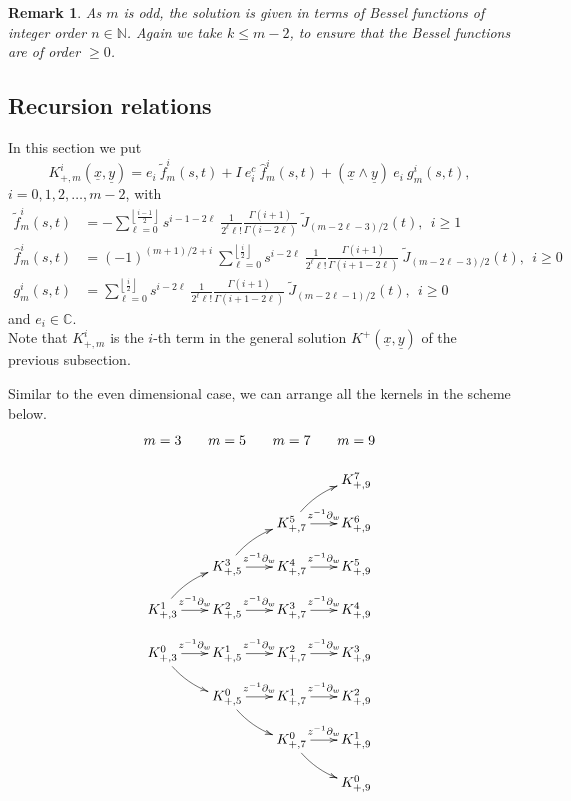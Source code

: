 \documentclass{amsart}
\newtheorem{remark}[theorem]{Remark}
\theoremstyle{remark}
\begin{document}
\begin{remark}
As $m$ is odd, the solution is given in terms of Bessel functions of integer order $n \in \mathbb{N}$. Again we take $k \leq m-2$, to ensure that the Bessel functions are of order $\geq 0$.
\end{remark}
\subsection{Recursion relations}
In this section we put
\begin{equation}\label{kernel odd m}
K^{i}_{+ , m}({\underline{x}},{\underline{y}})  =  e_i \ \tilde{f}_m^i(s,t) + I \ e_i^c \ \hat{f}_m^i(s,t) + ({\underline{x}} \wedge {\underline{y}}) \ e_i \ g_m^i(s,t),
\end{equation}
$i=0,1,2, \ldots , m-2$, with
\begin{align*}
\tilde{f}_m^i(s,t) &= -  \sum_{\ell =0}^{\left\lfloor  \frac{i-1}{2} \right\rfloor} s^{i-1-2 \ell} \ \frac{1}{2^{\ell} \ell!} \frac{\Gamma(i+1)}{\Gamma(i-2\ell)} \ \widetilde{J}_{(m-2\ell-3)/2}(t) , \ \ i \geq 1\\
\hat{f}_m^i (s,t) &=  (-1)^{(m+1)/2+i} \   \sum_{\ell =0}^{\left\lfloor  \frac{i}{2} \right\rfloor} s^{i-2 \ell} \ \frac{1}{2^{\ell} \ell!} \frac{\Gamma(i+1)}{\Gamma(i+1-2\ell)} \ \widetilde{J}_{(m-2\ell-3)/2}(t), \ \ i \geq 0\\
g_m^i(s,t) &=    \sum_{\ell =0}^{\left\lfloor  \frac{i}{2} \right\rfloor} s^{i-2 \ell} \ \frac{1}{2^{\ell} \ell!} \frac{\Gamma(i+1)}{\Gamma(i+1-2\ell)} \ \widetilde{J}_{(m-2\ell-1)/2}(t), \ \  i \geq 0 
\end{align*}
and $e_i \in \mathbb{C}$.\\
Note that $K_{+,m}^i$ is the $i$-th term in the general solution $K^+({\underline{x}},{\underline{y}})$ of the previous subsection.

Similar to the even dimensional case, we can arrange all the kernels in the scheme below.
\[
\xymatrix@=13pt{m=3&m=5&m=7&m=9\\
&&&K_{+,9}^{7}\\
&&K_{+,7}^{5}\ar@/^/[ur] \ar[r]^-{z^{-1}\partial_{w}}&K_{+,9}^{6}\\
&K_{+,5}^{3} \ar@/^/[ur]\ar[r]^-{z^{-1}\partial_{w}}&K_{+,7}^{4}\ar[r]^-{z^{-1}\partial_{w}}&K_{+,9}^{5}\\
K_{+,3}^{1} \ar@/^/[ur]  \ar[r]^-{z^{-1}\partial_{w}}&K_{+,5}^{2} \ar[r]^-{z^{-1}\partial_{w}}&K_{+,7}^{3} \ar[r]^-{z^{-1}\partial_{w}}&K_{+,9}^{4}\\
K_{+,3}^{0}  \ar@/_/[dr] \ar[r]^-{z^{-1}\partial_{w}}&K_{+,5}^{1} \ar[r]^-{z^{-1}\partial_{w}}&K_{+,7}^{2} \ar[r]^-{z^{-1}\partial_{w}}&K_{+,9}^{3}\\
&K_{+,5}^{0} \ar@/_/[dr] \ar[r]^-{z^{-1}\partial_{w}}&K_{+,7}^{1}\ar[r]^-{z^{-1}\partial_{w}}&K_{+,9}^{2}\\
&&K_{+,7}^{0} \ar@/_/[dr] \ar[r]^-{z^{-1}\partial_{w}}&K_{+,9}^{1}\\
&&&K_{+,9}^{0}
}
\]
\end{document}
